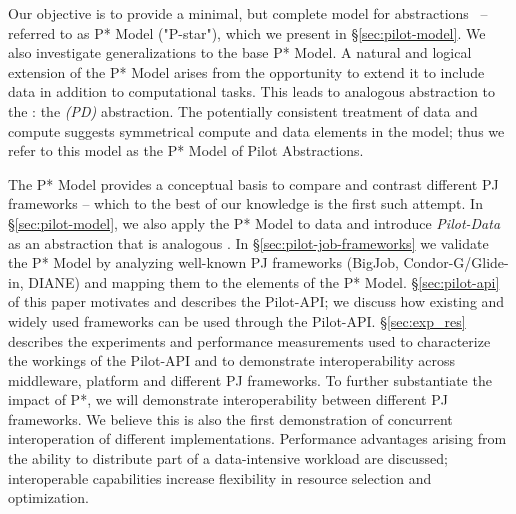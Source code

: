 \documentclass[conference]{IEEEtran}
\begin{document}



Our objective is to provide a minimal, but complete model for \pilot
abstractions~\cite{pstar-2012} -- referred to as P* Model ("P-star"),
which we present in \S\ref{sec:pilot-model}.  We also investigate
generalizations to the base P* Model.  A natural and logical extension
of the P* Model arises from the opportunity to extend it to include
data in addition to computational tasks. This leads to analogous
abstraction to the \pilotjob: the \emph{\pilotdata (PD)}
abstraction. The potentially consistent treatment of data and compute
suggests symmetrical compute and data elements in the model; thus we
refer to this model as the P* Model of Pilot Abstractions.

The P* Model provides a conceptual basis to compare and contrast
different PJ frameworks -- which to the best of our knowledge is the
first such attempt. In \S\ref{sec:pilot-model}, we also apply the P*
Model to data and introduce {\it Pilot-Data} as an abstraction 
that is analogous \pilotjobs. In \S\ref{sec:pilot-job-frameworks}
we validate the P* Model by analyzing well-known PJ frameworks
(BigJob, Condor-G/Glide-in, DIANE) and mapping them to the elements of
the P* Model. \S\ref{sec:pilot-api} of this paper motivates and
describes the Pilot-API; we discuss how existing and widely used
\pilotjob frameworks can be used through the
Pilot-API. \S\ref{sec:exp_res} describes the experiments and
performance measurements used to characterize the workings of the
Pilot-API and to demonstrate interoperability across middleware,
platform and different PJ frameworks. To further substantiate the
impact of P*, we will demonstrate interoperability between different
PJ frameworks. %
We believe this is also the first demonstration of concurrent
interoperation of different \pilotjob implementations. Performance
advantages arising from the ability to distribute part of a
data-intensive workload are discussed; interoperable capabilities
increase flexibility in resource selection and optimization.
\end{document}
